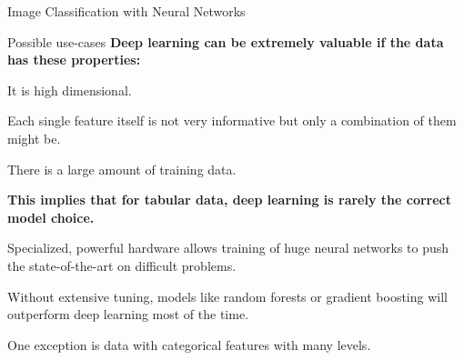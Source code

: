 \documentclass[11pt,compress,t,notes=noshow, xcolor=table]{beamer}
\begin{document}
\begin{frame}{Image Classification with Neural Networks}
\begin{overlayarea}{\textwidth}{\textheight}
\end{overlayarea}
  
\end{frame}



\begin{frame}{Possible use-cases}
\textbf{Deep learning can be extremely valuable if the data has these properties:}
\begin{itemizeM}
\item It is high dimensional.
\item Each single feature itself is not very informative but only a combination of them might be.
\item There is a large amount of training data.
\end{itemizeM}
\textbf{This implies that for tabular data, deep learning is rarely the correct model choice.}
\begin{itemizeM}
\item Specialized, powerful hardware allows training of huge neural networks to push the state-of-the-art on difficult problems.
\item Without extensive tuning, models like random forests or gradient boosting will outperform deep learning most of the time.
\item One exception is data with categorical features with many levels.
\end{itemizeM}
\end{frame}
\end{document}
